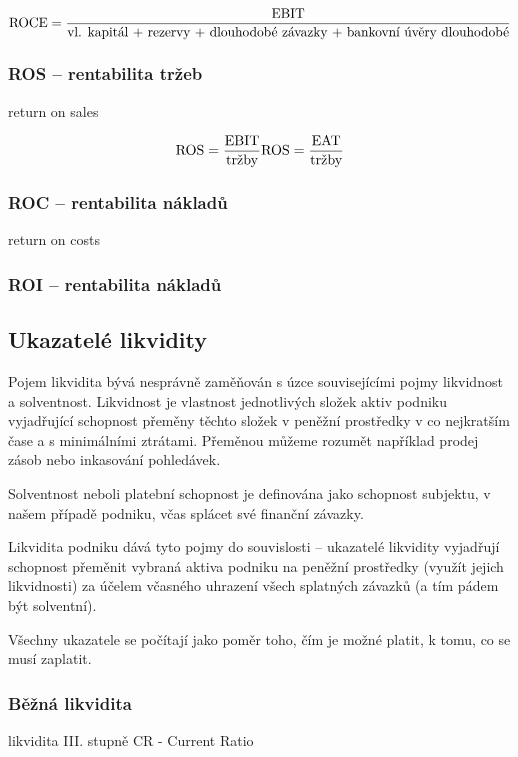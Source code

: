 $$\text{ROCE} = \dfrac{\text{EBIT}}{\text{vl. kapitál + rezervy + dlouhodobé závazky + bankovní úvěry dlouhodobé}}$$ 

\subsubsection{ROS -- rentabilita tržeb}

return on sales

$$\text{ROS} = \dfrac{\text{EBIT}}{\text{tržby}} \text{ROS} = \dfrac{\text{EAT}}{\text{tržby}}$$ 

\subsubsection{ROC -- rentabilita nákladů}

return on costs

\subsubsection{ROI -- rentabilita nákladů}







\subsection{Ukazatelé likvidity}
Pojem likvidita bývá nesprávně zaměňován s úzce souvisejícími pojmy likvidnost a solventnost. Likvidnost je vlastnost jednotlivých složek aktiv podniku vyjadřující schopnost přeměny těchto složek v peněžní prostředky v co nejkratším čase a s minimálními ztrátami\cite{nyvlt}. Přeměnou můžeme rozumět například prodej zásob nebo inkasování pohledávek. 

Solventnost neboli platební schopnost je definována jako schopnost subjektu, v našem případě podniku, včas splácet své finanční závazky.

Likvidita podniku dává tyto pojmy do souvislosti -- ukazatelé likvidity vyjadřují schopnost přeměnit vybraná aktiva podniku na peněžní prostředky (využít jejich likvidnosti) za účelem včasného uhrazení všech splatných závazků (a tím pádem být solventní).

Všechny ukazatele se počítají jako poměr toho, čím je možné platit, k tomu, co se musí zaplatit.

\subsubsection{Běžná likvidita} 
likvidita III. stupně
CR - Current Ratio

